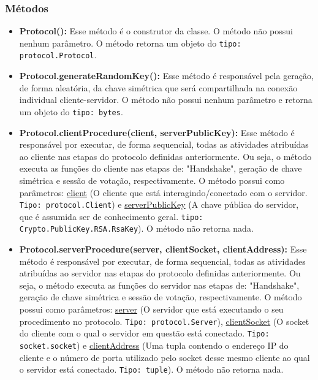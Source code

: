 \documentclass[10pt]{article}
\begin{document}
\begin{itemize}
        \subsubsection{\large Métodos}
            \begin{itemize}
             \item \textbf{Protocol():} Esse método é o construtor da classe. O método não possui nenhum parâmetro. O método retorna um objeto do \texttt{tipo: protocol.Protocol}.
             \item \textbf{Protocol.generateRandomKey():} Esse método é responsável pela geração, de forma aleatória, da chave simétrica que será compartilhada na conexão individual cliente-servidor. O método não possui nenhum parâmetro e retorna um objeto do \texttt{tipo: bytes}.
             \item \textbf{Protocol.clientProcedure(client, serverPublicKey):} Esse método é responsável por executar, de forma sequencial, todas as atividades atribuídas ao cliente nas etapas do protocolo definidas anteriormente. Ou seja, o método executa as funções do cliente nas etapas de: "Handshake", geração de chave simétrica e sessão de votação, respectivamente. O método possui como parâmetros: \underline{client} (O cliente que está interagindo/conectado com o servidor. \texttt{Tipo: protocol.Client}) e \underline{serverPublicKey} (A chave pública do servidor, que é assumida ser de conhecimento geral. \texttt{tipo: Crypto.PublicKey.RSA.RsaKey}). O método não retorna nada.
             \item \textbf{Protocol.serverProcedure(server, clientSocket, clientAddress):} Esse método é responsável por executar, de forma sequencial, todas as atividades atribuídas ao servidor nas etapas do protocolo definidas anteriormente. Ou seja, o método executa as funções do servidor nas etapas de: "Handshake", geração de chave simétrica e sessão de votação, respectivamente. O método possui como parâmetros: \underline{server} (O servidor que está executando o seu procedimento no protocolo. \texttt{Tipo: protocol.Server}), \underline{clientSocket} (O socket do cliente com o qual o servidor em questão está conectado. \texttt{Tipo: socket.socket}) e \underline{clientAddress} (Uma tupla contendo o endereço IP do cliente e o número de porta utilizado pelo socket desse mesmo cliente ao qual o servidor está conectado. \texttt{Tipo: tuple}). O método não retorna nada.
            \end{itemize}
    \end{itemize}
\end{document}
